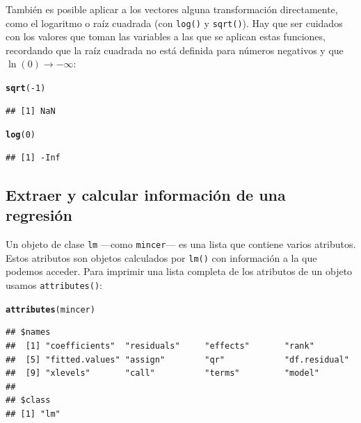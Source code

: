 \documentclass{article}\usepackage[]{graphicx}\usepackage[]{color}
\makeatletter
\newcommand{\hlnum}[1]{\textcolor[rgb]{0.686,0.059,0.569}{#1}}%
\newcommand{\hlopt}[1]{\textcolor[rgb]{0,0,0}{#1}}%
\newcommand{\hlstd}[1]{\textcolor[rgb]{0.345,0.345,0.345}{#1}}%
\newcommand{\hlkwd}[1]{\textcolor[rgb]{0.737,0.353,0.396}{\textbf{#1}}}%
\newenvironment{kframe}{%
 \def\at@end@of@kframe{}%
 \ifinner\ifhmode%
  \def\at@end@of@kframe{\end{minipage}}%
  \begin{minipage}{\columnwidth}%
 \fi\fi%
 \def\FrameCommand##1{\hskip\@totalleftmargin \hskip-\fboxsep
 \colorbox{shadecolor}{##1}\hskip-\fboxsep
     \hskip-\linewidth \hskip-\@totalleftmargin \hskip\columnwidth}%
 \MakeFramed {\advance\hsize-\width
   \@totalleftmargin\z@ \linewidth\hsize
   \@setminipage}}%
 {\par\unskip\endMakeFramed%
 \at@end@of@kframe}
\newenvironment{knitrout}{}{} %
\makeatother
\begin{document}
También es posible aplicar a los vectores alguna transformación directamente, como el logaritmo o raíz cuadrada (con \verb|log()| y \verb|sqrt()|). Hay que ser cuidados con los valores que toman las variables a las que se aplican estas funciones, recordando que la raíz cuadrada no está definida para números negativos y que $\ln(0) \rightarrow -\infty$:

\begin{knitrout}
\color{fgcolor}\begin{kframe}
\begin{alltt}
\hlkwd{sqrt}\hlstd{(}\hlopt{-}\hlnum{1}\hlstd{)}
\end{alltt}
\begin{verbatim}
## [1] NaN
\end{verbatim}
\begin{alltt}
\hlkwd{log}\hlstd{(}\hlnum{0}\hlstd{)}
\end{alltt}
\begin{verbatim}
## [1] -Inf
\end{verbatim}
\end{kframe}
\end{knitrout}


\subsection{Extraer y calcular información de una regresión}

Un objeto de clase \verb|lm| ---como \verb|mincer|--- es una lista que contiene varios atributos. Estos atributos son objetos calculados por \verb|lm()| con información a la que podemos acceder. Para imprimir una lista completa de los atributos de un objeto usamos \verb|attributes()|:

\begin{knitrout}
\color{fgcolor}\begin{kframe}
\begin{alltt}
\hlkwd{attributes}\hlstd{(mincer)}
\end{alltt}
\begin{verbatim}
## $names
##  [1] "coefficients"  "residuals"     "effects"       "rank"         
##  [5] "fitted.values" "assign"        "qr"            "df.residual"  
##  [9] "xlevels"       "call"          "terms"         "model"        
## 
## $class
## [1] "lm"
\end{verbatim}
\end{kframe}
\end{knitrout}
\end{document}
